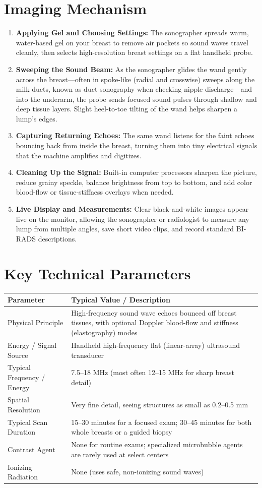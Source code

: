 \section{Imaging Mechanism}
\begin{enumerate}
\item \textbf{Applying Gel and Choosing Settings:} The sonographer spreads warm, water-based gel on your breast to remove air pockets so sound waves travel cleanly, then selects high-resolution breast settings on a flat handheld probe.
\item \textbf{Sweeping the Sound Beam:} As the sonographer glides the wand gently across the breast---often in spoke-like (radial and crosswise) sweeps along the milk ducts, known as duct sonography when checking nipple discharge---and into the underarm, the probe sends focused sound pulses through shallow and deep tissue layers. Slight heel-to-toe tilting of the wand helps sharpen a lump's edges.
\item \textbf{Capturing Returning Echoes:} The same wand listens for the faint echoes bouncing back from inside the breast, turning them into tiny electrical signals that the machine amplifies and digitizes.
\item \textbf{Cleaning Up the Signal:} Built-in computer processors sharpen the picture, reduce grainy speckle, balance brightness from top to bottom, and add color blood-flow or tissue-stiffness overlays when needed.
\item \textbf{Live Display and Measurements:} Clear black-and-white images appear live on the monitor, allowing the sonographer or radiologist to measure any lump from multiple angles, save short video clips, and record standard BI-RADS descriptions.
\end{enumerate}

\section{Key Technical Parameters}
\noindent
\begin{tabularx}{\textwidth}{@{}l X@{}}
\toprule
\textbf{Parameter} & \textbf{Typical Value / Description} \\
\midrule
Physical Principle & High-frequency sound wave echoes bounced off breast tissues, with optional Doppler blood-flow and stiffness (elastography) modes \\
Energy / Signal Source & Handheld high-frequency flat (linear-array) ultrasound transducer \\
Typical Frequency / Energy & 7.5--18 MHz (most often 12--15 MHz for sharp breast detail) \\
Spatial Resolution & Very fine detail, seeing structures as small as 0.2--0.5 mm \\
Typical Scan Duration & 15--30 minutes for a focused exam; 30--45 minutes for both whole breasts or a guided biopsy \\
Contrast Agent & None for routine exams; specialized microbubble agents are rarely used at select centers \\
Ionizing Radiation & None (uses safe, non-ionizing sound waves) \\
\bottomrule
\end{tabularx}

